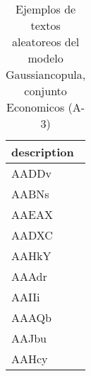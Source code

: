 \begin{table}[H]
\centering
\fontsize{8}{14}\selectfont
\caption{Ejemplos de textos aleatoreos del modelo Gaussiancopula, conjunto Economicos (A-3)}
\label{table-sample10-economicos-a-3-gaussiancopula-text}
\begin{tabular}{|m{50em}|}
\hline
\rowcolor[gray]{0.8}
description \\
\hline AADDv \\
\hline AABNs \\
\hline AAEAX \\
\hline AADXC \\
\hline AAHkY \\
\hline AAAdr \\
\hline AAIIi \\
\hline AAAQb \\
\hline AAJbu \\
\hline AAHcy \\
\hline
\end{tabular}
\end{table}
